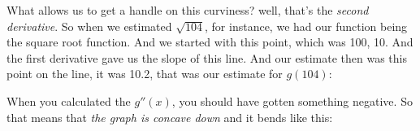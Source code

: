 \documentclass[pdftex, brazil, 12pt, twoside]{article}
\begin{document}
What allows us to get a handle on this curviness?
well, that's the \emph{second derivative}.
So when we estimated $\sqrt{104}$, for instance,
we had our function being the square root function.
And we started with this point, which was 100, 10.
And the first derivative gave us the slope of this line.
And our estimate then was this point on the line,
it was 10.2, that was our estimate for $g(104)$:

\begin{figure}[H]
  \begin{center}
  \end{center}
\end{figure}

When you calculated the $g''(x)$,
you should have gotten something negative.
So that means that \emph{the graph is concave down}
and it bends like this:

\begin{figure}[H]
  \begin{center}
  \end{center}
\end{figure}
\end{document}
